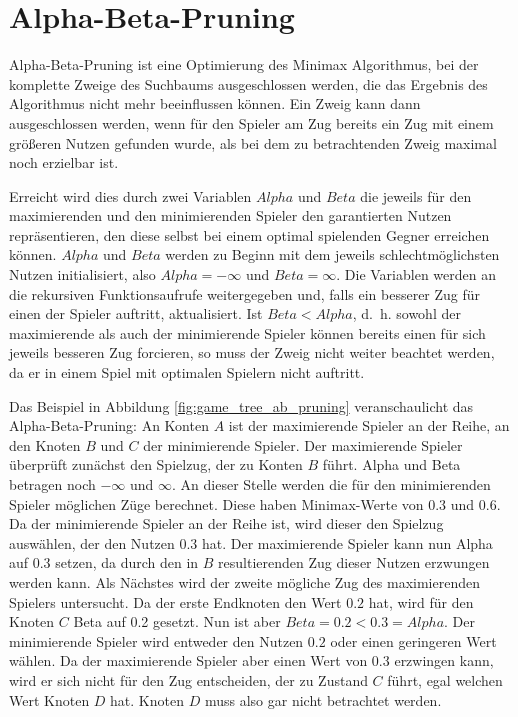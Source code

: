 \section{Alpha-Beta-Pruning}
\label{sec:alphabeta}

Alpha-Beta-Pruning ist eine Optimierung des Minimax Algorithmus, bei der komplette Zweige des Suchbaums ausgeschlossen
werden, die das Ergebnis des Algorithmus nicht mehr beeinflussen können. Ein Zweig kann dann ausgeschlossen werden, wenn
für den Spieler am Zug bereits ein Zug mit einem größeren Nutzen gefunden wurde, als bei dem zu betrachtenden Zweig
maximal noch erzielbar ist.

Erreicht wird dies durch zwei Variablen $Alpha$ und $Beta$ die jeweils für den maximierenden und den minimierenden
Spieler den garantierten Nutzen repräsentieren, den diese selbst bei einem optimal spielenden Gegner erreichen können.
$Alpha$ und $Beta$ werden zu Beginn mit dem jeweils schlechtmöglichsten Nutzen initialisiert, also $Alpha = -\infty$ und
$Beta = \infty$. Die Variablen werden an die rekursiven Funktionsaufrufe weitergegeben und, falls ein besserer Zug für
einen der Spieler auftritt, aktualisiert. Ist $Beta < Alpha$, d. h. sowohl der maximierende als auch der minimierende
Spieler können bereits einen für sich jeweils besseren Zug forcieren, so muss der Zweig nicht weiter beachtet werden, da
er in einem Spiel mit optimalen Spielern nicht auftritt.

Das Beispiel in Abbildung \ref{fig:game_tree_ab_pruning} veranschaulicht das Alpha-Beta-Pruning: An Konten $A$ ist der
maximierende Spieler an der Reihe, an den Knoten $B$ und $C$ der minimierende Spieler. Der maximierende Spieler
überprüft zunächst den Spielzug, der zu Konten $B$ führt. Alpha und Beta betragen noch $-\infty$ und $\infty$. An dieser
Stelle werden die für den minimierenden Spieler möglichen Züge berechnet. Diese haben Minimax-Werte von $0.3$ und $0.6$.
Da der minimierende Spieler an der Reihe ist, wird dieser den Spielzug auswählen, der den Nutzen $0.3$ hat. Der
maximierende Spieler kann nun Alpha auf 0.3 setzen, da durch den in $B$ resultierenden Zug dieser Nutzen erzwungen
werden kann. Als Nächstes wird der zweite mögliche Zug des maximierenden Spielers untersucht. Da der erste Endknoten den
Wert $0.2$ hat, wird für den Knoten $C$ Beta auf 0.2 gesetzt. Nun ist aber $Beta=0.2<0.3=Alpha$. Der minimierende
Spieler wird entweder den Nutzen $0.2$ oder einen geringeren Wert wählen. Da der maximierende Spieler aber einen Wert
von $0.3$ erzwingen kann, wird er sich nicht für den Zug entscheiden, der zu Zustand $C$ führt, egal welchen Wert Knoten
$D$ hat. Knoten $D$ muss also gar nicht betrachtet werden.

